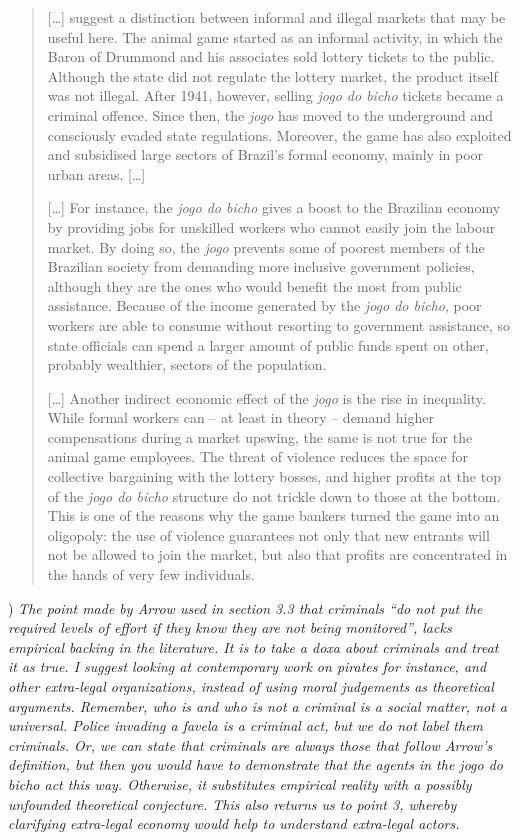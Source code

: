 \documentclass[a4paper,12pt]{article}
\begin{document}
\begin{quote}
	[\dots] \citet{cross2006risk} suggest a distinction between informal and illegal markets that may be useful here. The animal game started as an informal activity, in which the Baron of Drummond and his associates sold lottery tickets to the public. Although the state did not regulate the lottery market, the product itself was not illegal. After 1941, however, selling \textit{jogo do bicho} tickets became a criminal offence. Since then, the \textit{jogo} has moved to the underground and consciously evaded state regulations. Moreover, the game has also exploited and subsidised large sectors of Brazil's formal economy, mainly in poor urban areas. [\dots]

	[\dots] For instance, the \textit{jogo do bicho} gives a boost to the Brazilian economy by providing jobs for unskilled workers who cannot easily join the labour market. By doing so, the \textit{jogo} prevents some of poorest members of the Brazilian society from demanding more inclusive government policies, although they are the ones who would benefit the most from public assistance. Because of the income generated by the \textit{jogo do bicho}, poor workers are able to consume without resorting to government assistance, so state officials can spend a larger amount of public funds spent on other, probably wealthier, sectors of the population.

	[\dots] Another indirect economic effect of the \textit{jogo} is the rise in inequality. While formal workers can -- at least in theory -- demand higher compensations during a market upswing, the same is not true for the animal game employees. The threat of violence reduces the space for collective bargaining with the lottery bosses, and higher profits at the top of the \textit{jogo do bicho} structure do not trickle down to those at the bottom. This is one of the reasons why the game bankers turned the game into an oligopoly: the use of violence guarantees not only that new entrants will not be allowed to join the market, but also that profits are concentrated in the hands of very few individuals.  
\end{quote}

\vspace{.5cm}

) \textit{The point made by Arrow used in section 3.3 that criminals ``do not put the required levels of effort if they know they are not being monitored'', lacks empirical backing in the literature. It is to take a doxa about criminals and treat it as true. I suggest looking at contemporary work on pirates for instance, and other extra-legal organizations, instead of using moral judgements as theoretical arguments. Remember, who is and who is not a criminal is a social matter, not a universal. Police invading a favela is a criminal act, but we do not label them criminals. Or, we can state that criminals are always those that follow Arrow's definition, but then you would have to demonstrate that the agents in the jogo do bicho act this way. Otherwise, it substitutes empirical reality with a possibly unfounded theoretical conjecture. This also returns us to point 3, whereby clarifying extra-legal economy would help to understand extra-legal actors.} 
\end{document}
